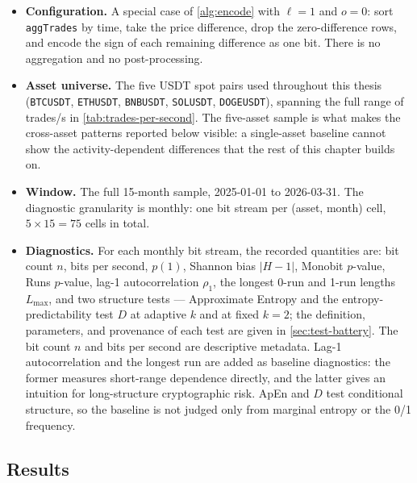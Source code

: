 \documentclass[11pt,titlepage,openany,oneside]{book}  %
\begin{document}
\begin{itemize}
\item \textbf{Configuration.} A special case of \cref{alg:encode} with $\ell = 1$ and $o = 0$: sort \texttt{aggTrades} by time, take the price difference, drop the zero-difference rows, and encode the sign of each remaining difference as one bit. There is no aggregation and no post-processing.

\item \textbf{Asset universe.} The five USDT spot pairs used throughout this thesis (\texttt{BTCUSDT}, \texttt{ETHUSDT}, \texttt{BNBUSDT}, \texttt{SOLUSDT}, \texttt{DOGEUSDT}), spanning the full range of trades/s in \cref{tab:trades-per-second}. The five-asset sample is what makes the cross-asset patterns reported below visible: a single-asset baseline cannot show the activity-dependent differences that the rest of this chapter builds on.

\item \textbf{Window.} The full 15-month sample, 2025-01-01 to 2026-03-31. The diagnostic granularity is monthly: one bit stream per (asset, month) cell, $5 \times 15 = 75$ cells in total.

\item \textbf{Diagnostics.} For each monthly bit stream, the recorded quantities are: bit count $n$, bits per second, $p(1)$, Shannon bias $|H - 1|$, Monobit $p$-value, Runs $p$-value, lag-1 autocorrelation $\rho_1$, the longest 0-run and 1-run lengths $L_{\max}$, and two structure tests --- Approximate Entropy and the entropy-predictability test $D$ at adaptive $k$ and at fixed $k = 2$; the definition, parameters, and provenance of each test are given in \cref{sec:test-battery}. The bit count $n$ and bits per second are descriptive metadata. Lag-1 autocorrelation and the longest run are added as baseline diagnostics: the former measures short-range dependence directly, and the latter gives an intuition for long-structure cryptographic risk. ApEn and $D$ test conditional structure, so the baseline is not judged only from marginal entropy or the 0/1 frequency.

\end{itemize}

\subsection{Results}
\label{sec:exp1-results}
\end{document}
